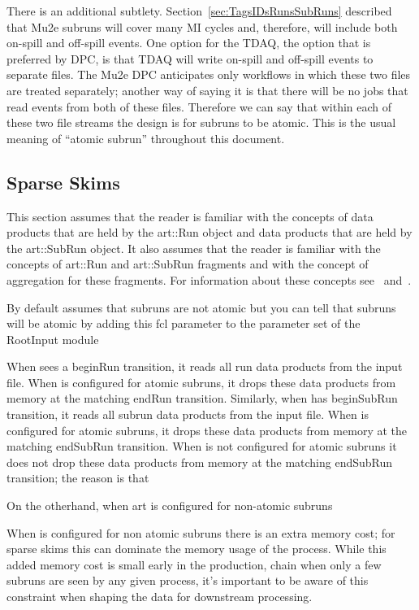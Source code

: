 There is an additional subtlety.
Section~\ref{sec:TagsIDsRunsSubRuns} described that Mu2e subruns will cover many MI cycles
and, therefore, will include both on-spill and off-spill events.
One option for the TDAQ, the option that is preferred by DPC,
is that TDAQ will write on-spill and off-spill events to separate files.
The Mu2e DPC anticipates only workflows in which these two files are treated separately;
another way of saying it is that there will be no jobs that read events from both of these files.
Therefore we can say that within each of these two file streams the design is for subruns to be atomic.
This is the usual meaning of ``atomic subrun'' throughout this document.

\subsection{Sparse Skims}

This section assumes that the reader is familiar with the \art concepts
of data products that are held by the {\code art::Run} object
and data products that are held by the {\code art::SubRun} object.
It also assumes that the reader is familiar with the \art concepts
of {\code art::Run} and {\code art::SubRun} fragments
and with the concept of aggregation for these fragments.
For information about these concepts see~\cite{RunAndSubRunProducts}
and~\cite{ProductAggregation}.


By default \art assumes that subruns are not atomic
but you can tell \art that subruns will be atomic by adding this fcl
parameter to the parameter set of the RootInput module


When \art sees a beginRun transition, it reads all run data products from the input file.
When \art is configured for atomic subruns, it drops these data products
from memory at the matching endRun transition.
Similarly, when \art has beginSubRun transition, it reads all subrun data products from the input file.
When \art is configured for atomic subruns, it drops these data products
from memory at the matching endSubRun transition.
When \art is not configured for atomic subruns it does not drop these data products from
memory at the matching endSubRun transition; the reason is that 

On the otherhand, when art is configured for non-atomic subruns

When \art is configured for non atomic subruns there is an extra memory cost;
for sparse skims this can dominate the memory usage of the process.
While this added memory cost is small early in the production, chain when
only a few subruns are seen by any given process, it's important to be
aware of this constraint when shaping the data for downstream processing.

